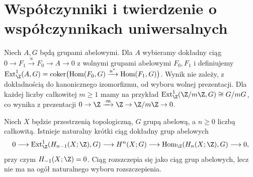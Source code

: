 \section{Współczynniki i twierdzenie o współczynnikach uniwersalnych}

\begin{uwaga}
Niech $A,G$ będą grupami abelowymi. Dla $A$ wybieramy dokładny ciąg
$0\to F_1\xrightarrow{u} F_0\to A\to0$ z wolnymi grupami
abelowymi $F_0,F_1$ i definiujemy
$\operatorname{Ext}^1_{\Z}(A,G)=
\operatorname{coker}\bigl(\operatorname{Hom}(F_0,G)
\xrightarrow{u^*}\operatorname{Hom}(F_1,G)\bigr)$.
Wynik nie zależy, z dokładnością do kanonicznego izomorfizmu,
od wyboru wolnej prezentacji. Dla każdej liczby całkowitej
$m\geq1$ mamy na przykład
$\operatorname{Ext}^1_{\Z}(\Z/m\Z,G)\cong G/mG$,
co wynika z prezentacji $0\to\Z\xrightarrow{\cdot m}\Z
\to\Z/m\Z\to0$.
\end{uwaga}

\begin{twierdzenie}
Niech $X$ będzie przestrzenią topologiczną, $G$ grupą abelową,
a $n\geq0$ liczbą całkowitą. Istnieje naturalny krótki ciąg
dokładny grup abelowych
\[
0\longrightarrow\operatorname{Ext}^1_{\Z}(H_{n-1}(X;\Z),G)
\longrightarrow H^n(X;G)
\longrightarrow\operatorname{Hom}_{\Z}(H_n(X;\Z),G)
\longrightarrow0,
\]
przy czym $H_{-1}(X;\Z)=0$. Ciąg rozszczepia się jako ciąg
grup abelowych, lecz nie ma na ogół naturalnego wyboru rozszczepienia.
\end{twierdzenie}



